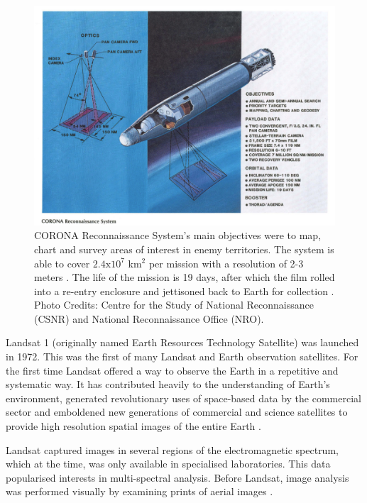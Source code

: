 \begin{figure}[H]
\centering
\includegraphics[totalheight=0.3\textheight]{CORONA REC .png}
\caption{CORONA Reconnaissance System's main objectives were to map, chart and survey areas of interest in enemy territories. The system is able to cover $\mathrm{2.4x10^{7}}$ km$^{2}$ per mission with a resolution of 2-3 meters \cite{CORONA}. The life of the mission is 19 days, after which the film rolled into a re-entry enclosure and jettisoned back to Earth for collection \cite{CORONA}. Photo Credits: Centre for the Study of National Reconnaissance (CSNR) and National Reconnaissance Office (NRO).
}
\end{figure}

Landsat 1 (originally named Earth Resources Technology Satellite) was launched in 1972. This was the first of many Landsat and Earth observation satellites. For the first time Landsat offered a way to observe the Earth in a repetitive and systematic way. It has contributed heavily to the understanding of Earth's environment, generated revolutionary uses of space-based data by the commercial sector and emboldened new generations of commercial and science satellites to provide high resolution spatial images of the entire Earth \cite{campbell2011introduction, Williams:2006:0099-1112:1171}.

\par

Landsat captured images in several regions of the electromagnetic spectrum, which at the time, was only available in specialised laboratories. This data popularised interests in multi-spectral analysis. Before Landsat, image analysis was performed visually by examining prints of aerial images \cite{campbell2011introduction}.

